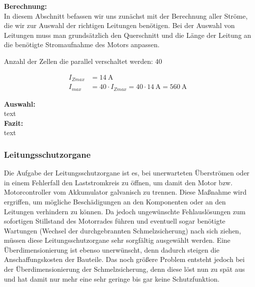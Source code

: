 \textbf{Berechnung:} 
\\[2mm]
In diesem Abschnitt befassen wir uns zunächst mit der Berechnung aller Ströme, die wir zur Auswahl der richtigen Leitungen benötigen. Bei der Auswahl von Leitungen muss man grundsätzlich den Querschnitt und die Länge der Leitung an die benötigte Stromaufnahme des Motors anpassen.

Anzahl der Zellen die parallel verschaltet werden: 40


\begin{align*}
I_{Zmax} &= 14~\mathrm{A}	\\
I_{max} &= 40 \cdot I_{Zmax} = 40 \cdot 14~\mathrm{A} = 560~\mathrm{A}
\end{align*}
%


%



\textbf{Auswahl:}
\\[2mm]
text
\\[5mm]

\textbf{Fazit:}
\\[2mm]
text

\newpage



\subsubsection{Leitungsschutzorgane}
Die Aufgabe der Leitungsschutzorgane ist es, bei unerwarteten Überströmen oder in einem Fehlerfall den Laststromkreis zu öffnen, um damit den Motor bzw. Motorcontroller vom Akkumulator galvanisch zu trennen. Diese Maßnahme wird ergriffen, um mögliche Beschädigungen an den Komponenten oder an den Leitungen verhindern zu können. Da jedoch ungewünschte Fehlauslösungen zum sofortigen Stillstand des Motorrades führen und eventuell sogar benötigte Wartungen (Wechsel der durchgebrannten Schmelzsicherung) nach sich ziehen, müssen diese Leitungsschutzorgane sehr sorgfältig ausgewählt werden. Eine Überdimensionierung ist ebenso unerwünscht, denn dadurch steigen die Anschaffungskosten der Bauteile. Das noch größere Problem entsteht jedoch bei der Überdimensionierung der Schmelzsicherung, denn diese löst nun zu spät aus und hat damit nur mehr eine sehr geringe bis gar keine Schutzfunktion. 

